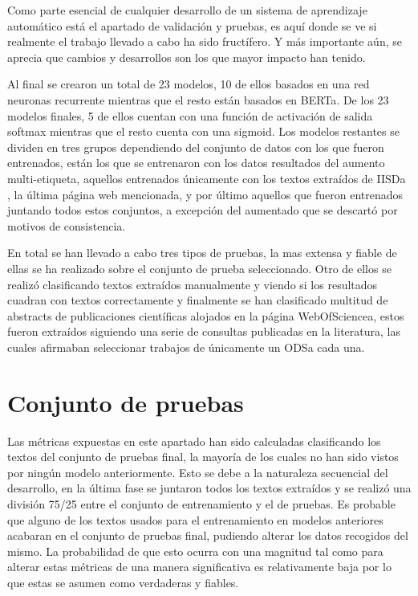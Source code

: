 Como parte esencial de cualquier desarrollo de un sistema de aprendizaje
automático está el apartado de validación y pruebas, es aquí donde se ve si
realmente el trabajo llevado a cabo ha sido fructífero. Y más importante aún, se
aprecia que cambios y desarrollos son los que mayor impacto han tenido.

Al final se crearon un total de 23 modelos, 10 de ellos basados en una red
neuronas recurrente mientras que el resto están basados en \gls{BERTa}. De los 23
modelos finales, 5 de ellos cuentan con una función de activación de salida
softmax mientras que el resto cuenta con una sigmoid. Los modelos restantes se
dividen en tres grupos dependiendo del conjunto de datos con los que fueron
entrenados, están los que se entrenaron con los datos resultados del aumento
multi-etiqueta, aquellos entrenados únicamente con los textos extraídos de
\gls{IISDa} \cite{IISDHomepage}, la última página web mencionada, y por
último aquellos que fueron entrenados juntando todos estos conjuntos, a
excepción del aumentado que se descartó por motivos de consistencia. 

En total se han llevado a cabo tres tipos de pruebas, la mas extensa y fiable de
ellas se ha realizado sobre el conjunto de prueba seleccionado. Otro de ellos se
realizó clasificando textos extraídos manualmente y viendo si los resultados
cuadran con textos correctamente y finalmente se han clasificado multitud de
abstracts de publicaciones científicas alojados en la página \gls{WebOfSciencea}, estos fueron
extraídos siguiendo una serie de consultas publicadas en la literatura, las
cuales afirmaban seleccionar trabajos de únicamente un \gls{ODSa} cada una.

\section{Conjunto de pruebas}
Las métricas expuestas en este apartado han sido calculadas clasificando los
textos del conjunto de pruebas final, la mayoría de los cuales no han sido
vistos por ningún modelo anteriormente. Esto se debe a la naturaleza secuencial
del desarrollo, en la última fase se juntaron todos los textos extraídos y se
realizó una división 75/25 entre el conjunto de entrenamiento y el de pruebas. Es
probable que alguno de los textos usados para el entrenamiento en modelos
anteriores acabaran en el conjunto de pruebas final, pudiendo alterar los datos
recogidos del mismo. La probabilidad de que esto ocurra con una magnitud tal
como para alterar estas métricas de una manera significativa es relativamente
baja por lo que estas se asumen como verdaderas y fiables.

